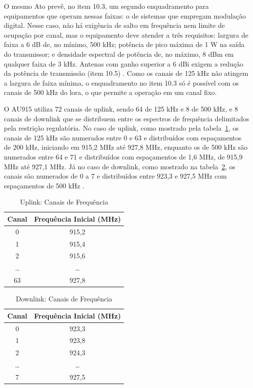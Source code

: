 O mesmo Ato prevê, no item 10.3, um segundo enquadramento para equipamentos 
que operam nessas faixas: o de sistemas que empregam modulação digital. 
Nesse caso, não há exigência de salto em frequência nem limite de ocupação 
por canal, mas o equipamento deve atender a três requisitos: largura de faixa 
a 6 dB de, no mínimo, 500 kHz; potência de pico máxima de 1 W na saída do 
transmissor; e densidade espectral de potência de, no máximo, 8 dBm em qualquer 
faixa de 3 kHz. Antenas com ganho superior a 6 dBi exigem a redução da 
potência de transmissão (item 10.5) \cite{anatel2017}. Como os canais de 125 kHz 
não atingem a largura de faixa mínima, o enquadramento no item 10.3 só é possível 
com os canais de 500 kHz do \gls{lora}, o que permite a operação em um canal fixo.

O AU915 utiliza 72 canais de uplink, sendo 64 de 125 kHz e 8 de 500 kHz, e 8 
canais de downlink que se distribuem entre os espectros de frequência
delimitados pela restrição regulatória. No caso de uplink, 
como mostrado pela tabela~\ref{tab:uplink_freq_channel}, 
os canais de 125 kHz são numerados entre 0 e 63 e distribuídos com espaçamentos de 200 kHz,
iniciando em 915,2 MHz até 927,8 MHz, enquanto os de 500 kHz são numerados entre 64 e 71 
e distribuídos com espaçamentos de 1,6 MHz, de 915,9 MHz até 927,1 MHz. Já no caso de downlink, 
como mostrado na tabela~\ref{tab:downlink_freq_channel}, os canais são numerados de 
0 a 7 e distribuídos entre 923,3 e 927,5 MHz com espaçamentos de 500 kHz 
\cite{lora_alliance_rp002_105}. 

\begin{table}[H]
  \centering
  \caption{Uplink: Canais de Frequência}
  \label{tab:uplink_freq_channel}
  \begin{tabular}{|c|c|}
    \hline
    \textbf{Canal} & \textbf{Frequência Inicial (MHz)} \\ \hline
      0  & 915,2 \\ \hline
      1  & 915,4  \\ \hline
      2  & 915,6  \\ \hline
      … &  …  \\ \hline
      63 & 927,8 \\ \hline
  \end{tabular}
\end{table}

\begin{table}[H]
  \centering
  \caption{Downlink: Canais de Frequência}
  \label{tab:downlink_freq_channel}
  \begin{tabular}{|c|c|}
    \hline
   \textbf{Canal} & \textbf{Frequência Inicial (MHz)} \\ \hline
      0  & 923,3 \\ \hline
      1  & 923,8  \\ \hline
      2  & 924,3  \\ \hline
      … &  …  \\ \hline
      7 & 927,5 \\ \hline
  \end{tabular}
\end{table}

